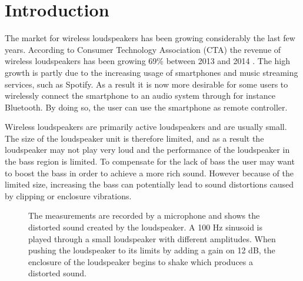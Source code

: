 \chapter{Introduction}

The market for wireless loudspeakers has been growing considerably the last few years. According to Consumer Technology Association (CTA) the revenue of wireless loudspeakers has been growing 69\% between 2013 and 2014 \cite{sou:CTA}. The high growth is partly due to the increasing usage of smartphones and music streaming services, such as Spotify. As a result it is now more desirable for some users to wirelessly connect the smartphone to an audio system through for instance Bluetooth. By doing so, the user can use the smartphone as remote controller. 

Wireless loudspeakers are primarily active loudspeakers and are usually small. The size of the loudspeaker unit is therefore limited, and as a result the loudspeaker may not play very loud and the performance of the loudspeaker in the bass region is limited. To compensate for the lack of bass the user may want to boost the bass in order to achieve a more rich sound. However because of the limited size, increasing the bass can potentially lead to sound distortions caused by clipping or enclosure vibrations.




% 




\begin{figure}[H]
\centering
{}

\caption{The measurements are recorded by a microphone and shows the distorted sound created by the loudspeaker. A 100 Hz sinusoid is played through a small loudspeaker with different amplitudes. When pushing the loudspeaker to its limits by adding a gain on 12 dB, the enclosure of the loudspeaker begins to shake which produces a distorted sound.}
\label{fig:test}
\end{figure}